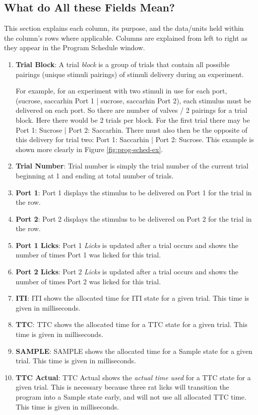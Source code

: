 \documentclass{article}
\begin{document}
\subsection{What do All these Fields Mean?}
This section explains each column, its purpose, and the data/units held within the column's rows where applicable. Columns are explained from left to right as they 
appear in the Program Schedule window.
\begin{enumerate}
    \item \textbf{Trial Block}: A trial \textit{block} is a group of trials that contain all possible pairings (unique stimuli pairings) of stimuli delivery during an 
        experiment. 
        
        For example, for an experiment with two stimuli in use for each port, (sucrose, saccarhin Port 1 | sucrose, saccarhin Port 2), each stimulus must be 
        delivered on each port. So there are number of valves / 2 pairings for a trial block. Here there would be 2 trials per block. For the first trial there may be
        Port 1: Sucrose | Port 2: Saccarhin. There must also then be the opposite of this delivery for trial two: Port 1: Saccarhin | Port 2: Sucrose. This example is shown 
        more clearly in Figure \ref{fig:prog-sched-ex}.
    \item \textbf{Trial Number}: Trial number is simply the trial number of the current trial beginning at 1 and ending at total number of trials.
    \item \textbf{Port 1}: Port 1 displays the stimulus to be delivered on Port 1 for the trial in the row.
    \item \textbf{Port 2}: Port 2 displays the stimulus to be delivered on Port 2 for the trial in the row.
    \item \textbf{Port 1 Licks}: Port 1 \textit{Licks} is updated after a trial occurs and shows the number of times Port 1 was licked for this trial.
    \item \textbf{Port 2 Licks}: Port 2 \textit{Licks} is updated after a trial occurs and shows the number of times Port 2 was licked for this trial.
    \item \textbf{ITI}: ITI shows the allocated time for ITI state for a given trial. This time is given in milliseconds. 
    \item \textbf{TTC}: TTC shows the allocated time for a TTC state for a given trial. This time is given in milliseconds. 
    \item \textbf{SAMPLE}: SAMPLE shows the allocated time for a Sample state for a given trial. This time is given in milliseconds. 
    \item \textbf{TTC Actual}: TTC Actual shows the \textit{actual time used} for a TTC state for a given trial. This is necessary because three rat licks will transition the 
        program into a Sample state early, and will not use all allocated TTC time. This time is given in milliseconds. 
\end{enumerate}
\end{document}
